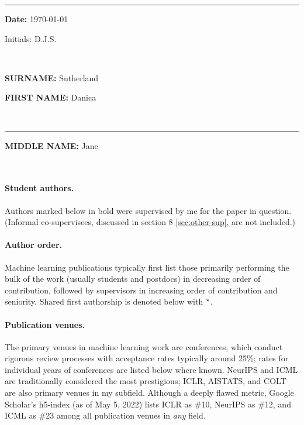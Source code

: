 \documentclass[10pt]{article}
\begin{document}


\newpage
{}\bigskip\rule{3.5in}{0mm}
\parbox[t]{2in}{{\bf Date:} \today}\parbox[t]{1in}{Initials: D.J.S.} \\
\noindent\parbox[t]{.5in}{\mbox{}}\parbox[t]{3.04in}{{\bf SURNAME:}
  Sutherland}\parbox[t]{3.2in}{{\bf FIRST NAME:} Danica}
\\\rule{3.54in}{0mm}\parbox[t]{3.2in}{{\bf MIDDLE NAME:} Jane}
\\[5mm]
\setcounter{section}{0}
\vspace{12pt}

\paragraph{Student authors.} Authors marked below in bold were supervised by me for the paper in question.
(Informal co-supervisees, discussed in section 8 \ref{sec:other-sup}, are not included.)

\paragraph{Author order.} Machine learning publications typically first list those primarily performing the bulk of the work (usually students and postdocs) in decreasing order of contribution,
followed by supervisors in increasing order of contribution and seniority.
Shared first authorship is denoted below with $^\star$.

\paragraph{Publication venues.} The primary venues in machine learning work are conferences,
which conduct rigorous review processes with acceptance rates typically around 25\%;
rates for individual years of conferences are listed below where known.
NeurIPS and ICML are traditionally considered the most prestigious;
ICLR, AISTATS, and COLT are also primary venues in my subfield.
Although a deeply flawed metric, Google Scholar's h5-index (as of May 5, 2022) lists ICLR as \#10, NeurIPS as \#12, and ICML as \#23 among all publication venues in \emph{any} field.
\end{document}
